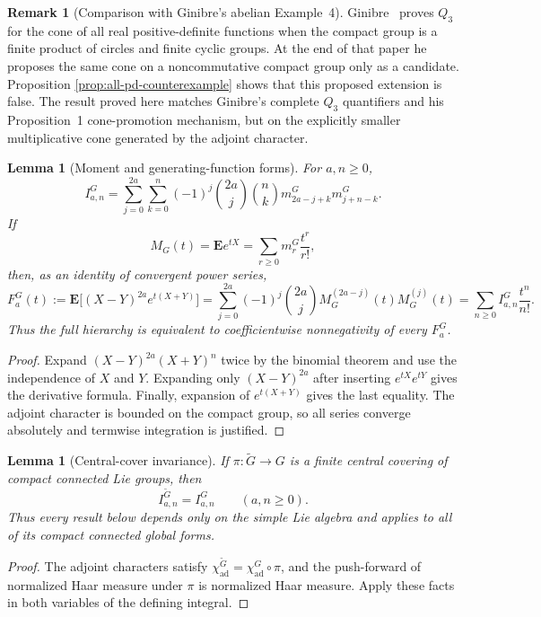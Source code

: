 \documentclass[11pt,reqno]{amsart}
\theoremstyle{plain}
\newtheorem{lemma}[theorem]{Lemma}
\theoremstyle{definition}
\newtheorem{remark}[theorem]{Remark}
\newcommand{\chiad}{\chi_{\mathrm{ad}}}
\begin{document}
\begin{remark}[Comparison with Ginibre's abelian Example~4]
\label{rem:ginibre-example4-comparison}
Ginibre~\cite[Example~4]{Ginibre1970} proves $Q_3$ for the cone of all real
positive-definite functions when the compact group is a finite product of
circles and finite cyclic groups.  At the end of that paper he proposes the
same cone on a noncommutative compact group only as a candidate.  Proposition
\ref{prop:all-pd-counterexample} shows that this proposed extension is false.
The result proved here matches Ginibre's complete $Q_3$ quantifiers and his
Proposition~1 cone-promotion mechanism, but on the explicitly smaller
multiplicative cone generated by the adjoint character.
\end{remark}

\begin{lemma}[Moment and generating-function forms]\label{lem:full-moment-form}
For $a,n\geq0$,
\[
 I^G_{a,n}
 =\sum_{j=0}^{2a}\sum_{k=0}^{n}
   (-1)^j\binom{2a}{j}\binom nk
   m^G_{2a-j+k}m^G_{j+n-k}.
\]
If
\[
 M_G(t)=\mathbf E e^{tX}
       =\sum_{r\geq0}m_r^G\frac{t^r}{r!},
\]
then, as an identity of convergent power series,
\[
 F_a^G(t):=\mathbf E\bigl[(X-Y)^{2a}e^{t(X+Y)}\bigr]
 =\sum_{j=0}^{2a}(-1)^j\binom{2a}{j}
   M_G^{(2a-j)}(t)M_G^{(j)}(t)
 =\sum_{n\geq0}I^G_{a,n}\frac{t^n}{n!}.
\]
Thus the full hierarchy is equivalent to coefficientwise nonnegativity of
every $F_a^G$.
\end{lemma}

\begin{proof}
Expand $(X-Y)^{2a}(X+Y)^n$ twice by the binomial theorem and use the
independence of $X$ and $Y$.  Expanding only $(X-Y)^{2a}$ after inserting
$e^{tX}e^{tY}$ gives the derivative formula.  Finally, expansion of
$e^{t(X+Y)}$ gives the last equality.  The adjoint character is bounded on
the compact group, so all series converge absolutely and termwise
integration is justified.
\end{proof}

\begin{lemma}[Central-cover invariance]\label{lem:full-central-cover}
If $\pi:\widetilde G\to G$ is a finite central covering of compact connected
Lie groups, then
\[
 I^{\widetilde G}_{a,n}=I^G_{a,n}
 \qquad(a,n\geq0).
\]
Thus every result below depends only on the simple Lie algebra and applies to
all of its compact connected global forms.
\end{lemma}

\begin{proof}
The adjoint characters satisfy
$\chiad^{\widetilde G}=\chiad^G\circ\pi$, and the push-forward of normalized
Haar measure under $\pi$ is normalized Haar measure.  Apply these facts in
both variables of the defining integral.
\end{proof}
\end{document}
